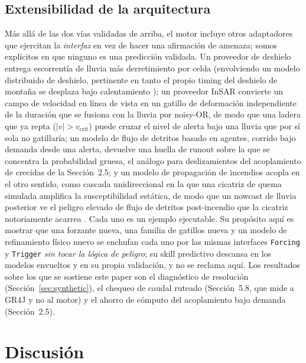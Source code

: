 \documentclass[authoryear,preprint,review,12pt]{elsarticle}
\begin{document}
\subsection{Extensibilidad de la arquitectura}

Más allá de las dos vías validadas de arriba, el motor incluye otros adaptadores
que ejercitan la \emph{interfaz} en vez de hacer una afirmación de amenaza; somos
explícitos en que ninguno es una predicción validada. Un proveedor de deshielo
entrega escorrentía de lluvia más derretimiento por celda (envolviendo un modelo
distribuido de deshielo, pertinente en tanto el propio timing del deshielo de
montaña se desplaza bajo calentamiento \citep{musselman2017}); un proveedor InSAR
convierte un campo de velocidad en línea de vista en un gatillo de deformación
independiente de la duración que se fusiona con la lluvia por noisy-OR, de modo que
una ladera que ya repta ($|v|>v_{\mathrm{crit}}$) puede cruzar el nivel de alerta
bajo una lluvia que por sí sola no gatillaría; un modelo de flujo de detritos
basado en agentes, corrido bajo demanda desde una alerta, devuelve una huella de
runout sobre la que se concentra la probabilidad gruesa, el análogo para
deslizamientos del acoplamiento de crecidas de la Sección~2.5; y un modelo de
propagación de incendios acopla en el otro sentido, como cascada unidireccional en
la que una cicatriz de quema simulada amplifica la susceptibilidad estática, de
modo que un nowcast de lluvia posterior ve el peligro elevado de flujo de detritos
post-incendio que la cicatriz notoriamente acarrea \citep{cannon2008}. Cada uno es
un ejemplo ejecutable. Su propósito aquí es mostrar que una forzante nueva, una
familia de gatillos nueva y un modelo de refinamiento físico nuevo se enchufan cada
uno por las mismas interfaces \texttt{Forcing} y \texttt{Trigger} \emph{sin tocar
la lógica de peligro}; su skill predictivo descansa en los modelos envueltos y en
su propia validación, y no se reclama aquí. Los resultados sobre los que se sostiene este paper
son el diagnóstico de resolución (Sección~\ref{sec:synthetic}), el chequeo de caudal ruteado
(Sección~5.8, que mide a GR4J y no al motor) y el ahorro de cómputo del acoplamiento bajo demanda (Sección~2.5).

\section{Discusión}
\end{document}
